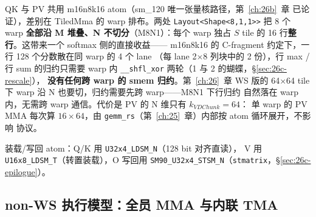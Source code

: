 QK 与 PV 共用 m16n8k16 atom（sm\_120 唯一张量核路径，第~\ref{ch:26b}~章
已论证），差别在 TiledMma 的 warp 排布。两处 \texttt{Layout<Shape<8,1,1>>}
把 8 个 warp \textbf{全部沿 M 堆叠、N 不切分}（M8N1）：每个 warp 独占
$S$ tile 的 16 行\textbf{整行}。这带来一个 softmax 侧的直接收益——
m16n8k16 的 C-fragment 约定下，一行 128 个分数散在同 warp 的 4 个 lane
（每 lane 2$\times$8 列块中的 2 份），行 max / 行 sum 的归约只需要
warp 内 \texttt{\_\_shfl\_xor} 两轮（1 与 2 的蝴蝶，\S\ref{sec:26c-rescale}），
\textbf{没有任何跨 warp 的 smem 归约}。第~\ref{ch:26}~章 WS 版的
64$\times$64 tile 下 warp 沿 N 也要切，归约需要先跨 warp——M8N1 下行归约
自然落在 warp 内，无需跨 warp 通信。代价是 PV 的 N 维只有 $k_{VDChunk}{=}64$：
单 warp 的 PV MMA 每次算 $16\times64$，由
\texttt{gemm\_rs}（第~\ref{ch:25}~章）内部按 atom 循环展开，不影响
协议。

装载/写回 atom：Q/K 用 \texttt{U32x4\_LDSM\_N}（128 bit 对齐直读），
V 用 \texttt{U16x8\_LDSM\_T}（转置装载），O 写回用
\texttt{SM90\_U32x4\_STSM\_N}（\texttt{stmatrix}，\S\ref{sec:26c-epilogue}）。

\subsection{non-WS 执行模型：全员 MMA 与内联 TMA}\label{sec:26c-nonws}

